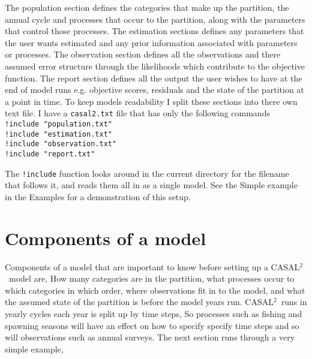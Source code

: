 \documentclass[12pt]{article}
\newcommand{\CAS}{CASAL$^2$}
\begin{document}
The population section defines the categories that make up the partition, the annual cycle and processes that occur to the partition, along with the parameters that control those processes. The estimation sections defines any parameters that the user wants estimated and any prior information associated with parameters or processes. The observation section defines all the observations and there assumed error structure through the likelihoods which contribute to the objective function. The report section defines all the output the user wishes to have at the end of model runs e.g. objective scores, residuals and the state of the partition at a point in time. To keep models readability I split these sections into there own text file. I have a \texttt{casal2.txt} file that has only the following commands\\
\texttt{!include "population.txt"}\\
\texttt{!include "estimation.txt"}\\
\texttt{!include "observation.txt"}\\
\texttt{!include "report.txt"}

The \texttt{!include} function looks around in the current directory for the filename that follows it, and reads them all in as a single model. See the Simple example in the Examples for a demonstration of this setup.

\section{Components of a model}\label{Sec:comp}
Components of a model that are important to know before setting up a \CAS\ model are, How many categories are in the partition, what processes occur to which categories in which order, where observations fit in to the model, and what the assumed state of the partition is before the model years run. \CAS\ runs in yearly cycles each year is split up by time steps, So processes such as fishing and spawning seasons will have an effect on how to specify specify time steps and so will observations such as annual surveys. The next section runs through a very simple example,
\end{document}
